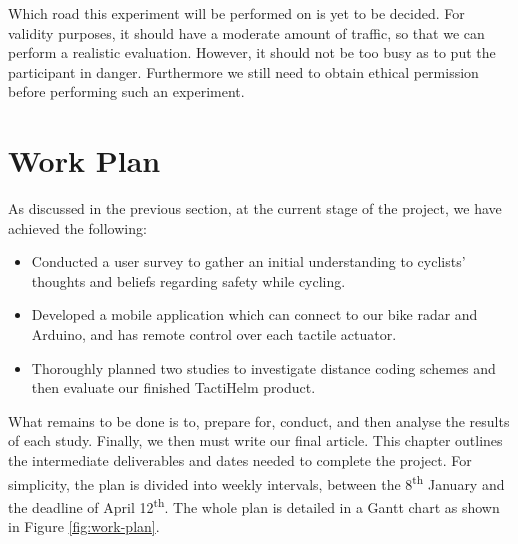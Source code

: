 \documentclass{interim}
\newcommand{\ts}{\textsuperscript}
\begin{document}
Which road this experiment will be performed on is yet to be decided. For validity purposes, it should have a moderate amount of traffic, so that we can perform a realistic evaluation. However, it should not be too busy as to put the participant in danger. Furthermore we still need to obtain ethical permission before performing such an experiment.


\section{Work Plan}
As discussed in the previous section, at the current stage of the project, we have achieved the following:
\begin{itemize}
    \item Conducted a user survey to gather an initial understanding to cyclists' thoughts and beliefs regarding safety while cycling.
    \item Developed a mobile application which can connect to our bike radar and Arduino, and has remote control over each tactile actuator.
    \item Thoroughly planned two studies to investigate distance coding schemes and then evaluate our finished TactiHelm product.
\end{itemize}
What remains to be done is to, prepare for, conduct, and then analyse the results of each study. Finally, we then must write our final article. This chapter outlines the intermediate deliverables and dates needed to complete the project. For simplicity, the plan is divided into weekly intervals, between the 8\ts{th} January and the deadline of April 12\ts{th}. The whole plan is detailed in a Gantt chart as shown in Figure \ref{fig:work-plan}.
\end{document}
